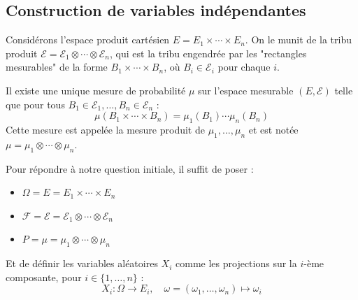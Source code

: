 \subsection{Construction de variables indépendantes}
Considérons l'espace produit cartésien $E = E_1 \times \cdots \times E_n$. On le munit de la tribu produit $\mathcal{E} = \mathcal{E}_1 \otimes \cdots \otimes \mathcal{E}_n$, qui est la tribu engendrée par les "rectangles mesurables" de la forme $B_1 \times \cdots \times B_n$, où $B_i \in \mathcal{E}_i$ pour chaque $i$.
\begin{theorem}
Il existe une unique mesure de probabilité $\mu$ sur l'espace mesurable $(E, \mathcal{E})$ telle que pour tous $B_1 \in \mathcal{E}_1, \ldots, B_n \in \mathcal{E}_n$ :
\[ \mu(B_1 \times \cdots \times B_n) = \mu_1(B_1) \cdots \mu_n(B_n) \]
Cette mesure est appelée la mesure produit de $\mu_1, \ldots, \mu_n$ et est notée $\mu = \mu_1 \otimes \cdots \otimes \mu_n$.
\end{theorem}
Pour répondre à notre question initiale, il suffit de poser :
\begin{itemize}
    \item $\Omega = E = E_1 \times \cdots \times E_n$
    \item $\mathcal{F} = \mathcal{E} = \mathcal{E}_1 \otimes \cdots \otimes \mathcal{E}_n$
    \item $P = \mu = \mu_1 \otimes \cdots \otimes \mu_n$
\end{itemize}
Et de définir les variables aléatoires $X_i$ comme les projections sur la $i$-ème composante, pour $i \in \{1, \ldots, n\}$ :
\[ X_i: \Omega \to E_i, \quad \omega = (\omega_1, \ldots, \omega_n) \mapsto \omega_i \]
